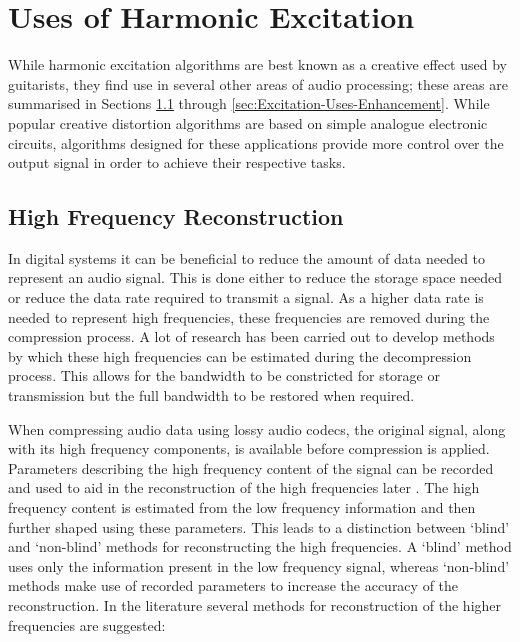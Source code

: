 \section{Uses of Harmonic Excitation}
\label{sec:Excitation-Uses}
	While harmonic excitation algorithms are best known as a creative effect used by guitarists, they find use in
	several other areas of audio processing; these areas are summarised in Sections
	\ref{sec:Excitation-Uses-Reconstruction} through \ref{sec:Excitation-Uses-Enhancement}. While popular creative
	distortion algorithms are based on simple analogue electronic circuits, algorithms designed for these applications
	provide more control over the output signal in order to achieve their respective tasks.

	\subsection{High Frequency Reconstruction}
	\label{sec:Excitation-Uses-Reconstruction}
		In digital systems it can be beneficial to reduce the amount of data needed to represent an audio signal.
		This is done either to reduce the storage space needed or reduce the data rate required to transmit a
		signal. As a higher data rate is needed to represent high frequencies, these frequencies are removed during
		the compression process. A lot of research has been carried out to develop methods by which these high
		frequencies can be estimated during the decompression process. This allows for the bandwidth to be
		constricted for storage or transmission but the full bandwidth to be restored when required.

		When compressing audio data using lossy audio codecs, the original signal, along with its high frequency
		components, is available before compression is applied. Parameters describing the high frequency content of
		the signal can be recorded and used to aid in the reconstruction of the high frequencies later
		\citep{dietz2002spectral, friedrich2007spectral}. The high frequency content is estimated from the low
		frequency information and then further shaped using these parameters. This leads to a distinction between
		`blind' and `non-blind' methods for reconstructing the high frequencies. A `blind' method uses only the
		information present in the low frequency signal, whereas `non-blind' methods make use of recorded
		parameters to increase the accuracy of the reconstruction. In the literature several methods for
		reconstruction of the higher frequencies are suggested:


